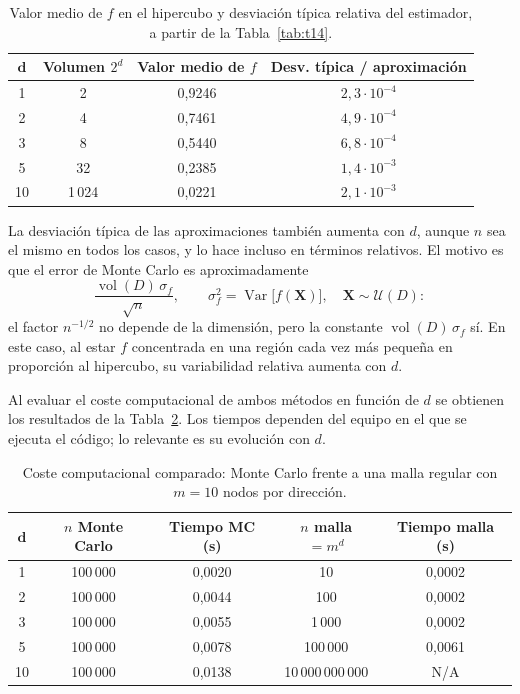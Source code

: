 \documentclass[11pt,a4paper]{article}
\newcommand{\cab}{\rowcolor{cabecera}}
\begin{document}
\begin{table}[H]
\centering
\caption{Valor medio de $f$ en el hipercubo y desviación típica relativa del estimador, a partir de la Tabla~\ref{tab:t14}.}\label{tab:t15}
\begin{tabular}{cccc}
\toprule
\cab $\boldsymbol{d}$ & \textbf{Volumen $2^d$} & \textbf{Valor medio de $f$} & \textbf{Desv. típica / aproximación}\\
\midrule
1 & 2 & 0,9246 & $2{,}3\cdot10^{-4}$\\
2 & 4 & 0,7461 & $4{,}9\cdot10^{-4}$\\
3 & 8 & 0,5440 & $6{,}8\cdot10^{-4}$\\
5 & 32 & 0,2385 & $1{,}4\cdot10^{-3}$\\
10 & 1\,024 & 0,0221 & $2{,}1\cdot10^{-3}$\\
\bottomrule
\end{tabular}
\end{table}

La desviación típica de las aproximaciones también aumenta con $d$, aunque $n$ sea el mismo en todos los casos, y lo hace incluso en términos relativos. El motivo es que el error de Monte Carlo es aproximadamente
\begin{equation}
\frac{\operatorname{vol}(D)\,\sigma_f}{\sqrt{n}}, \qquad \sigma_f^2=\operatorname{Var}\big[f(\mathbf{X})\big],\quad \mathbf{X}\sim\mathcal{U}(D):
\end{equation}
\noindent el factor $n^{-1/2}$ no depende de la dimensión, pero la constante $\operatorname{vol}(D)\,\sigma_f$ sí. En este caso, al estar $f$ concentrada en una región cada vez más pequeña en proporción al hipercubo, su variabilidad relativa aumenta con $d$.

Al evaluar el coste computacional de ambos métodos en función de $d$ se obtienen los resultados de la Tabla~\ref{tab:t16}. Los tiempos dependen del equipo en el que se ejecuta el código; lo relevante es su evolución con $d$.

\begin{table}[H]
\centering
\caption{Coste computacional comparado: Monte Carlo frente a una malla regular con $m = 10$ nodos por dirección.}\label{tab:t16}
\begin{tabular}{ccccc}
\toprule
\cab $\boldsymbol{d}$ & \textbf{$n$ Monte Carlo} & \textbf{Tiempo MC (s)} & \textbf{$n$ malla $= m^d$} & \textbf{Tiempo malla (s)}\\
\midrule
1 & 100\,000 & 0,0020 & 10 & 0,0002\\
2 & 100\,000 & 0,0044 & 100 & 0,0002\\
3 & 100\,000 & 0,0055 & 1\,000 & 0,0002\\
5 & 100\,000 & 0,0078 & 100\,000 & 0,0061\\
10 & 100\,000 & 0,0138 & 10\,000\,000\,000 & N/A\\
\bottomrule
\end{tabular}
\end{table}
\end{document}
